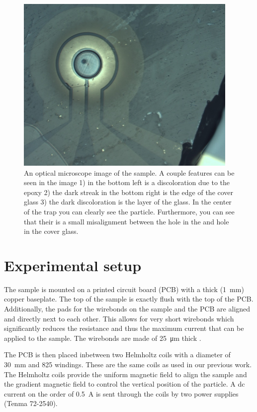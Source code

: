 \begin{figure}
    \centering
    \includegraphics{figures/sample/trap_optical_microscope.pdf}
    \caption{An optical microscope image of the sample. A couple features can be seen in the image 1) in the bottom left is a discoloration due to the epoxy 2) the dark streak in the bottom right is the edge of the cover glass 3) the dark discoloration is the  layer of the glass. In the center of the trap you can clearly see the  particle. Furthermore, you can see that their is a small misalignment between the hole in the  and hole in the cover glass.}
    \label{fig:optical-microscope-image-sample}
\end{figure}

\section{Experimental setup}
The sample is mounted on a printed circuit board (PCB) with a thick (\qty{1}{\mm}) copper baseplate. The top of the sample is exactly flush with the top of the PCB. Additionally, the pads for the wirebonds on the sample and the PCB are aligned and directly next to each other. This allows for very short wirebonds which significantly reduces the resistance and thus the maximum current that can be applied to the sample. The wirebonds are made of \qty{25}{\um} thick .

The PCB is then placed inbetween two Helmholtz coils with a diameter of \qty{30}{\mm} and 825 windings. These are the same coils as used in our previous work\cite{eli,mart}. The Helmholtz coils provide the uniform magnetic field to align the sample and the gradient magnetic field to control the vertical position of the particle. A dc current on the order of \qty{0.5}{\ampere} is sent through the coils by two power supplies (Tenma 72-2540).

